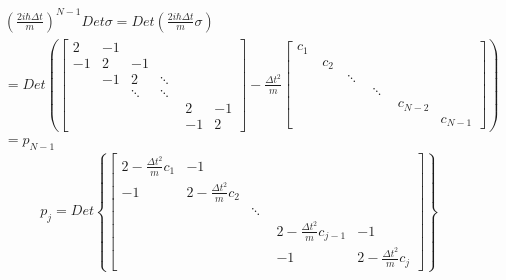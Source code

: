 \documentclass[a4paper,11pt]{article}
\begin{document}
\begin{equation*}
  \begin{split}
     &\left(\frac{2i\hbar\Delta t}{m}\right)^{N-1}Det\sigma=Det\left(\frac{2i\hbar\Delta t}{m}\sigma\right)\\
       &=Det\left(\begin{bmatrix}
                2 & -1 & \quad & \quad & \quad & \quad \\
                -1 & 2 & -1 & \quad & \quad & \quad \\
                \quad & -1 & 2 & \ddots & \quad & \quad \\
                \quad & \quad & \ddots & \ddots & \quad & \quad \\
                \quad & \quad & \quad & \quad & 2 & -1 \\
                \quad & \quad & \quad & \quad & -1 & 2
              \end{bmatrix}-\frac{\Delta t^2}{m}\begin{bmatrix}
                                                       c_1 & \quad & \quad & \quad & \quad & \quad \\
                                                       \quad & c_2 & \quad & \quad & \quad & \quad \\
                                                       \quad & \quad & \ddots & \quad & \quad & \quad \\
                                                       \quad & \quad & \quad & \ddots & \quad & \quad \\
                                                       \quad & \quad & \quad & \quad & c_{N-2} & \quad \\
                                                       \quad & \quad & \quad & \quad & \quad & c_{N-1}
                                                     \end{bmatrix}\right)\\
                                                     &=p_{N-1}
  \end{split}
\end{equation*}
\begin{equation*}
  p_j=Det\left\{\begin{bmatrix}
                  2-\frac{\Delta t^2}{m}c_1 & -1 & \quad & \quad & \quad \\
                  -1 & 2-\frac{\Delta t^2}{m}c_2 & \quad & \quad & \quad \\
                  \quad & \quad & \ddots & \quad & \quad \\
                  \quad & \quad & \quad & 2-\frac{\Delta t^2}{m}c_{j-1} & -1 \\
                  \quad & \quad & \quad & -1 & 2-\frac{\Delta t^2}{m}c_j
                \end{bmatrix}\right\}
\end{equation*}
\end{document}
